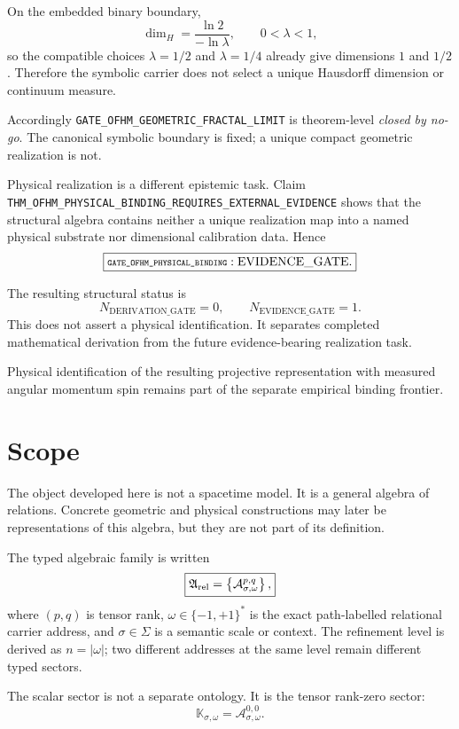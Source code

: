 \documentclass[11pt]{article}
\newcommand{\Arel}{\mathfrak A_{\rm rel}}
\newcommand{\claimid}[1]{\nolinkurl{#1}}
\newcommand{\claimidmath}[1]{\mbox{\scriptsize\ttfamily\detokenize{#1}}}
\begin{document}
On the embedded binary boundary,
\[
\dim_H
=
\frac{\ln2}{-\ln\lambda},
\qquad 0<\lambda<1,
\]
so the compatible choices \(\lambda=1/2\) and \(\lambda=1/4\) already give
dimensions \(1\) and \(1/2\). Therefore the symbolic carrier does not select
a unique Hausdorff dimension or continuum measure.

Accordingly
\claimid{GATE_OFHM_GEOMETRIC_FRACTAL_LIMIT}
is theorem-level \emph{closed by no-go}. The canonical symbolic boundary is
fixed; a unique compact geometric realization is not.

Physical realization is a different epistemic task. Claim
\claimid{THM_OFHM_PHYSICAL_BINDING_REQUIRES_EXTERNAL_EVIDENCE}
shows that the structural algebra contains neither a unique realization map
into a named physical substrate nor dimensional calibration data. Hence
\[
\boxed{
\claimidmath{GATE_OFHM_PHYSICAL_BINDING}
:
\mathrm{EVIDENCE\_GATE}.
}
\]

The resulting structural status is
\[
\boxed{
N_{\mathrm{DERIVATION\_GATE}}=0,
}
\qquad
\boxed{
N_{\mathrm{EVIDENCE\_GATE}}=1.
}
\]
This does not assert a physical identification. It separates completed
mathematical derivation from the future evidence-bearing realization task.

Physical identification of the resulting projective representation with
measured angular momentum spin remains part of the separate empirical binding
frontier.

\section{Scope}

The object developed here is not a spacetime model. It is a general algebra
of relations. Concrete geometric and physical constructions may later be
representations of this algebra, but they are not part of its definition.

The typed algebraic family is written
\[
\boxed{
\Arel=\left\{\mathcal A_{\sigma,\omega}^{p,q}\right\},
}
\]
where \((p,q)\) is tensor rank, \(\omega\in\{-1,+1\}^{*}\) is the exact
path-labelled relational carrier address, and \(\sigma\in\Sigma\) is a semantic
scale or context. The refinement level is derived as \(n=|\omega|\); two
different addresses at the same level remain different typed sectors.

The scalar sector is not a separate ontology. It is the tensor rank-zero
sector:
\[
\boxed{
\mathbb K_{\sigma,\omega}=\mathcal A_{\sigma,\omega}^{0,0}.
}
\]
\end{document}
